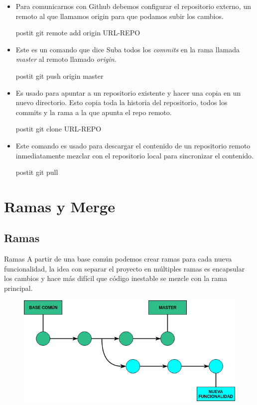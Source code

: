 \documentclass{beamer}
\begin{document}
\begin{frame}
\begin{itemize}
\item  Para comunicarnos con Github debemos configurar el repositorio externo, un remoto al que llamamos origin para que podamos subir los cambios. 
\begin{beamercolorbox}[sep=1mm]{postit}
git remote add origin URL-REPO
\end{beamercolorbox}
\item Este es un comando que dice Suba todos los \textit{commits} en la rama llamada \textit{master} al remoto llamado \textit{origin}.
\begin{beamercolorbox}[sep=1mm]{postit}
git push origin master
\end{beamercolorbox}
\item Es usado para apuntar a un repositorio existente y hacer una copia en un nuevo directorio. Esto copia toda la historia del repositorio, todos los commits y la rama a la que apunta el repo remoto.
\begin{beamercolorbox}[sep=1mm]{postit}
git clone URL-REPO
\end{beamercolorbox}
\item Este comando es usado para descargar el contenido de un repositorio remoto inmediatamente mezclar con el repositorio local para sincronizar el contenido. 
\begin{beamercolorbox}[wd={9cm},sep=1mm]{postit}
git pull
\end{beamercolorbox}
\end{itemize}
\end{frame}

\section{Ramas y Merge}
\subsection{Ramas}
\begin{frame}{Ramas}
A partir de una base común podemos crear ramas para cada nueva funcionalidad, la idea con separar el proyecto en múltiples ramas es encapsular los cambios y hace más difícil que código inestable se mezcle con la rama principal. \\
 \begin{figure}
 \centering
 \includegraphics[scale=0.45]{Imagenes/branch}
 \end{figure}
\end{frame}
\end{document}
